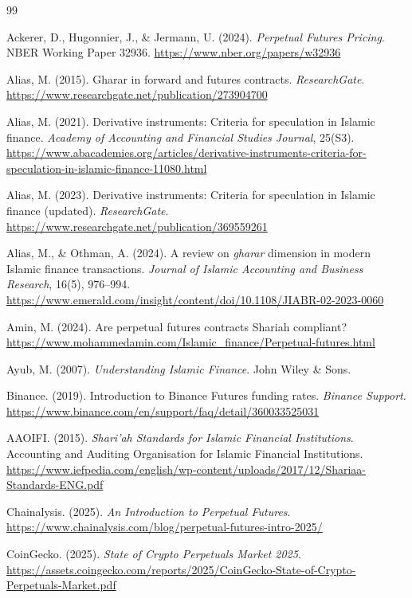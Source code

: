\documentclass[10pt,twocolumn]{article}
\begin{document}
\sloppy
\begin{thebibliography}{99}

Ackerer, D., Hugonnier, J., \& Jermann, U. (2024).
\textit{Perpetual Futures Pricing}.
NBER Working Paper 32936.
\url{https://www.nber.org/papers/w32936}

Alias, M. (2015).
Gharar in forward and futures contracts.
\textit{ResearchGate}.
\url{https://www.researchgate.net/publication/273904700}

Alias, M. (2021).
Derivative instruments: Criteria for speculation in Islamic finance.
\textit{Academy of Accounting and Financial Studies Journal}, 25(S3).
\url{https://www.abacademies.org/articles/derivative-instruments-criteria-for-speculation-in-islamic-finance-11080.html}

Alias, M. (2023).
Derivative instruments: Criteria for speculation in Islamic finance (updated).
\textit{ResearchGate}.
\url{https://www.researchgate.net/publication/369559261}

Alias, M., \& Othman, A. (2024).
A review on \textit{gharar} dimension in modern Islamic finance transactions.
\textit{Journal of Islamic Accounting and Business Research}, 16(5), 976--994.
\url{https://www.emerald.com/insight/content/doi/10.1108/JIABR-02-2023-0060}

Amin, M. (2024).
Are perpetual futures contracts Shariah compliant?
\url{https://www.mohammedamin.com/Islamic_finance/Perpetual-futures.html}

Ayub, M. (2007).
\textit{Understanding Islamic Finance}.
John Wiley \& Sons.

Binance. (2019).
Introduction to Binance Futures funding rates.
\textit{Binance Support}.
\url{https://www.binance.com/en/support/faq/detail/360033525031}

AAOIFI. (2015).
\textit{Shari'ah Standards for Islamic Financial Institutions}.
Accounting and Auditing Organisation for Islamic Financial Institutions.
\url{https://www.iefpedia.com/english/wp-content/uploads/2017/12/Shariaa-Standards-ENG.pdf}

Chainalysis. (2025).
\textit{An Introduction to Perpetual Futures}.
\url{https://www.chainalysis.com/blog/perpetual-futures-intro-2025/}

CoinGecko. (2025).
\textit{State of Crypto Perpetuals Market 2025}.
\url{https://assets.coingecko.com/reports/2025/CoinGecko-State-of-Crypto-Perpetuals-Market.pdf}


\end{thebibliography}
\end{document}
